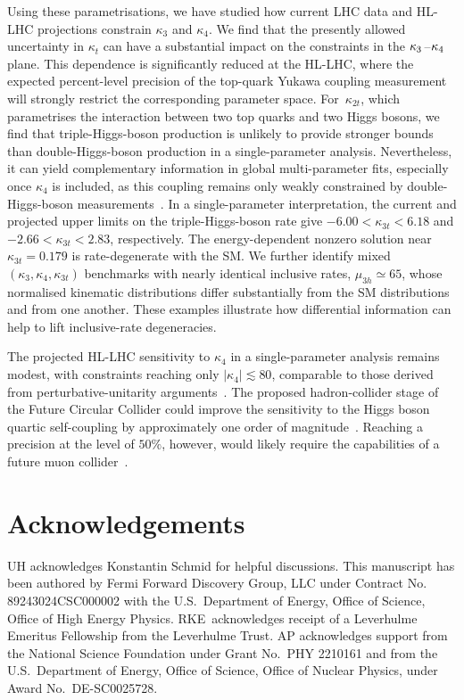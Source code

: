 \documentclass{SciPost}
\begin{document}
Using these parametrisations, we have studied how current LHC data and HL-LHC projections constrain $\kappa_3$ and $\kappa_4$. We find that the presently allowed uncertainty in $\kappa_t$ can have a substantial impact on the constraints in the $\kappa_3\hspace{0.25mm}$--$\hspace{0.25mm}\kappa_4$ plane. This dependence is significantly reduced at the HL-LHC, where the expected percent-level precision of the top-quark Yukawa coupling measurement will strongly restrict the corresponding parameter space. For~$\kappa_{2t}$, which parametrises the interaction between two top quarks and two Higgs bosons, we find that triple-Higgs-boson production is unlikely to provide stronger bounds than double-Higgs-boson production in a single-parameter analysis. Nevertheless, it can yield complementary information in global multi-parameter fits, especially once $\kappa_4$ is included, as this coupling remains only weakly constrained by double-Higgs-boson measurements~\cite{Bizon:2018syu,Borowka:2018pxx,Li:2024iio,Ding:2026qto}. In a single-parameter interpretation, the current and projected upper limits on the triple-Higgs-boson rate give $-6.00<\kappa_{3t}<6.18$ and $-2.66<\kappa_{3t}<2.83$, respectively. The energy-dependent nonzero solution near $\kappa_{3t}=0.179$ is rate-degenerate with the SM. We further identify mixed $(\kappa_3,\kappa_4,\kappa_{3t})$ benchmarks with nearly identical inclusive rates, $\mu_{3h}\simeq65$, whose normalised kinematic distributions differ substantially from the SM distributions and from one another. These examples illustrate how differential information can help to lift inclusive-rate degeneracies.

The projected HL-LHC sensitivity to $\kappa_4$ in a single-parameter analysis remains modest, with constraints reaching only $|\kappa_4|\lesssim 80$, comparable to those derived from perturbative-unitarity arguments~\cite{Liu:2018peg,Stylianou:2023xit,DiLuzio:2017tfn}. The proposed hadron-collider stage of the Future Circular Collider could improve the sensitivity to the Higgs boson quartic self-coupling by approximately one order of magnitude~\cite{Papaefstathiou:2015paa,Chen:2015gva,Fuks:2015hna,Kilian:2017nio,Fuks:2017zkg,Bizon:2018syu,Papaefstathiou:2023uum,Abouabid:2024gms,Dong:2025lkm,Haisch:2025pql,Fuks:2025gjv}. Reaching a precision at the level of $50\%$, however, would likely require the capabilities of a future muon collider~\cite{Chiesa:2020awd}.

\section*{Acknowledgements}
UH acknowledges Konstantin Schmid for helpful discussions. This manuscript has been authored by Fermi Forward Discovery Group, LLC under Contract No. 89243024CSC000002 with the U.S.\ Department of Energy, Office of Science, Office of High Energy Physics. RKE~acknowledges receipt of a Leverhulme Emeritus Fellowship from the Leverhulme Trust.
AP acknowledges support from the National Science Foundation under Grant No.\ PHY 2210161 and from the U.S.\ Department of Energy, Office of Science, Office of Nuclear Physics, under Award No.\ DE-SC0025728.
\end{document}
